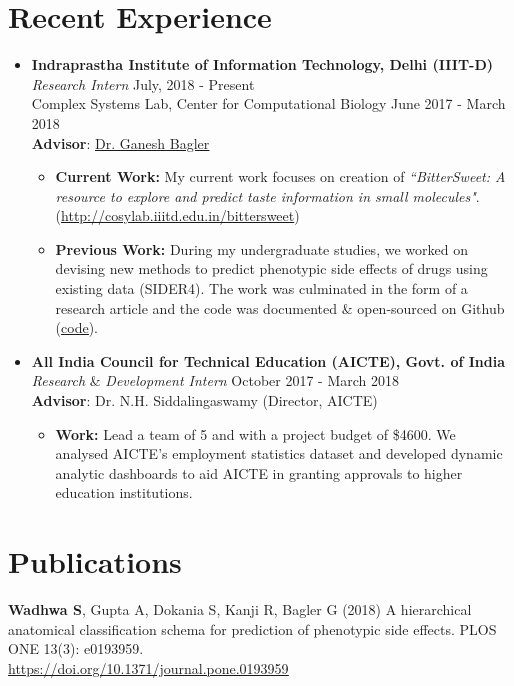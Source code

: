 \documentclass[margin,line]{res}
\begin{document}
\begin{resume}
\section{\sc Recent Experience}
\begin{itemize}[leftmargin=*]
\item {\bf Indraprastha Institute of Information Technology, Delhi (IIIT-D)}\\
\textit{Research Intern} \hfill July, 2018 - Present\\
Complex Systems Lab, Center for Computational Biology \hfill June 2017 - March 2018 \\  
{\bf Advisor}: {\href{https://scholar.google.co.in/citations?user=qyth_0QAAAAJ&hl=en}{\underline{Dr. Ganesh Bagler}}}
\begin{itemize}[leftmargin=*]
\item {\bf Current Work:} My current work focuses on creation of \textit{``BitterSweet: A resource to explore and predict taste information in small molecules"}. ({\href{http://cosylab.iiitd.edu.in/bittersweet/}{http://cosylab.iiitd.edu.in/bittersweet}})
\item {\bf Previous Work:} During my undergraduate studies, we worked on devising new methods to predict phenotypic side effects of drugs using existing data (SIDER4). The work was culminated in the form of a research article and the code was documented \& open-sourced on Github ({\href{https://github.com/sominwadhwa/drugADR}{\underline{code}}}).
\end{itemize}
\item {\bf All India Council for Technical Education (AICTE), Govt. of India}\\
\textit{Research} \& \textit{Development Intern} \hfill October 2017 - March 2018\\  
{\bf Advisor}: Dr. N.H. Siddalingaswamy (Director, AICTE)
\begin{itemize}[leftmargin=*]
\item {\bf Work:} Lead a team of 5 and with a project budget of \$4600. We analysed AICTE's employment statistics dataset and developed dynamic analytic dashboards to aid AICTE in granting approvals to higher education institutions.
\end{itemize}
\end{itemize}

\section{\sc Publications}
{\bf Wadhwa S}, Gupta A, Dokania S, Kanji R, Bagler G (2018) A hierarchical anatomical classification schema for prediction of phenotypic side effects. PLOS ONE 13(3): e0193959. 
\\{\href{https://doi.org/10.1371/journal.pone.0193959}{\underline{https://doi.org/10.1371/journal.pone.0193959}}}


\end{resume}
\end{document}
